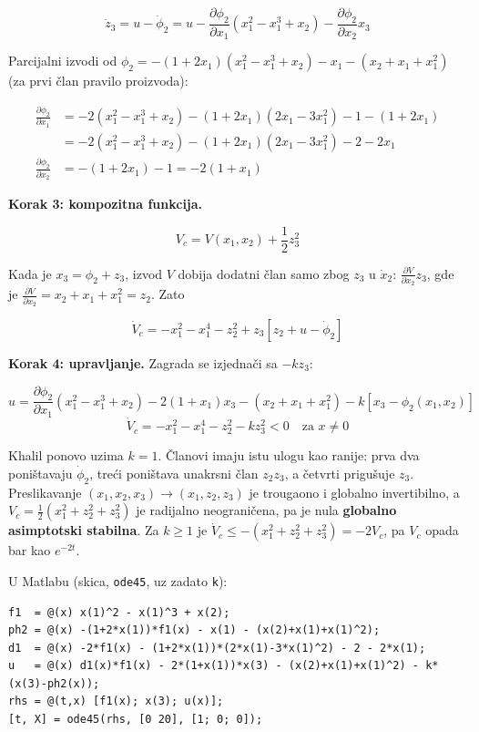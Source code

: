 \documentclass[11pt,a4paper,parskip=half,headsepline,numbers=noenddot]{scrartcl}
\begin{document}
\[\dot z_3 = u - \dot\phi_2 = u - \frac{\partial\phi_2}{\partial x_1}(x_1^2 - x_1^3 + x_2) - \frac{\partial\phi_2}{\partial x_2}x_3\]

Parcijalni izvodi od \(\phi_2 = -(1 + 2x_1)(x_1^2 - x_1^3 + x_2) - x_1 - (x_2 + x_1 + x_1^2)\) (za prvi član pravilo proizvoda):

\[
\begin{aligned}
\frac{\partial\phi_2}{\partial x_1} &= -2(x_1^2 - x_1^3 + x_2) - (1 + 2x_1)(2x_1 - 3x_1^2) - 1 - (1 + 2x_1) \\
&= -2(x_1^2 - x_1^3 + x_2) - (1 + 2x_1)(2x_1 - 3x_1^2) - 2 - 2x_1 \\
\frac{\partial\phi_2}{\partial x_2} &= -(1 + 2x_1) - 1 = -2(1 + x_1)
\end{aligned}
\]

\textbf{Korak 3: kompozitna funkcija.}

\[V_c = V(x_1, x_2) + \frac12z_3^2\]

Kada je \(x_3 = \phi_2 + z_3\), izvod \(V\) dobija dodatni član samo zbog \(z_3\) u \(\dot x_2\): \(\frac{\partial V}{\partial x_2}z_3\), gde je \(\frac{\partial V}{\partial x_2} = x_2 + x_1 + x_1^2 = z_2\). Zato

\[\dot V_c = -x_1^2 - x_1^4 - z_2^2 + z_3\left[z_2 + u - \dot\phi_2\right]\]

\textbf{Korak 4: upravljanje.} Zagrada se izjednači sa \(-kz_3\):

\begin{kljucna}
\[u = \frac{\partial\phi_2}{\partial x_1}(x_1^2 - x_1^3 + x_2) - 2(1 + x_1)x_3 - (x_2 + x_1 + x_1^2) - k\left[x_3 - \phi_2(x_1, x_2)\right]\]
\[\dot V_c = -x_1^2 - x_1^4 - z_2^2 - kz_3^2 < 0 \quad \text{za } x \ne 0\]
\end{kljucna}

Khalil ponovo uzima \(k = 1\). Članovi imaju istu ulogu kao ranije: prva dva poništavaju \(\dot\phi_2\), treći poništava unakrsni član \(z_2z_3\), a četvrti prigušuje \(z_3\). Preslikavanje \((x_1, x_2, x_3) \to (x_1, z_2, z_3)\) je trougaono i globalno invertibilno, a \(V_c = \frac12(x_1^2 + z_2^2 + z_3^2)\) je radijalno neograničena, pa je nula \textbf{globalno asimptotski stabilna}. Za \(k \ge 1\) je \(\dot V_c \le -(x_1^2 + z_2^2 + z_3^2) = -2V_c\), pa \(V_c\) opada bar kao \(e^{-2t}\).

U Matlabu (skica, \texttt{ode45}, uz zadato \texttt{k}):

\begin{verbatim}
f1  = @(x) x(1)^2 - x(1)^3 + x(2);
ph2 = @(x) -(1+2*x(1))*f1(x) - x(1) - (x(2)+x(1)+x(1)^2);
d1  = @(x) -2*f1(x) - (1+2*x(1))*(2*x(1)-3*x(1)^2) - 2 - 2*x(1);
u   = @(x) d1(x)*f1(x) - 2*(1+x(1))*x(3) - (x(2)+x(1)+x(1)^2) - k*(x(3)-ph2(x));
rhs = @(t,x) [f1(x); x(3); u(x)];
[t, X] = ode45(rhs, [0 20], [1; 0; 0]);
\end{verbatim}
\end{document}

